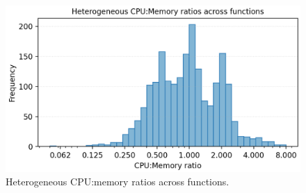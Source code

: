 

\begin{figure}[t]
  \centering
  \includegraphics[width=0.7\linewidth]
  {figures/background/cpu_mem_ratio_hist.png}
  \caption{Heterogeneous CPU:memory ratios across functions.}
  \label{fig:cpu_mem_ratio_hist}
\end{figure}



